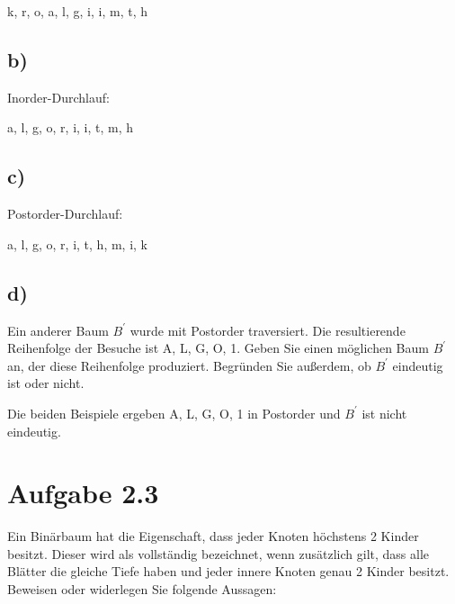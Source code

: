 \documentclass[a4paper]{article}
\begin{document}
k, r, o, a, l, g, i, i, m, t, h


\subsection*{b)}
Inorder-Durchlauf:

a, l, g, o, r, i, i, t, m, h

\subsection*{c)}
Postorder-Durchlauf:

a, l, g, o, r, i, t, h, m, i, k

\subsection*{d)}
Ein anderer Baum $B^{\prime}$ wurde mit Postorder traversiert. Die resultierende Reihenfolge der Besuche ist A, L, G, O, 1. Geben Sie einen möglichen Baum $B^{\prime}$ an, der diese Reihenfolge produziert. Begründen Sie außerdem, ob $B^{\prime}$ eindeutig ist oder nicht.

\begin{figure}[H]  %
  \begin{subfigure}[b]{0.4\textwidth}
  \end{subfigure}
  \hfill
  \begin{subfigure}[b]{0.4\textwidth}
  \end{subfigure}
\end{figure}
Die beiden Beispiele ergeben A, L, G, O, 1 in Postorder und $B^{\prime}$ ist nicht eindeutig.

\break

\section*{Aufgabe 2.3}
Ein Binärbaum hat die Eigenschaft, dass jeder Knoten höchstens 2 Kinder besitzt. Dieser wird als vollständig bezeichnet, wenn zusätzlich gilt, dass alle Blätter die gleiche Tiefe haben und jeder innere Knoten genau 2 Kinder besitzt. Beweisen oder widerlegen Sie folgende Aussagen:
\end{document}
